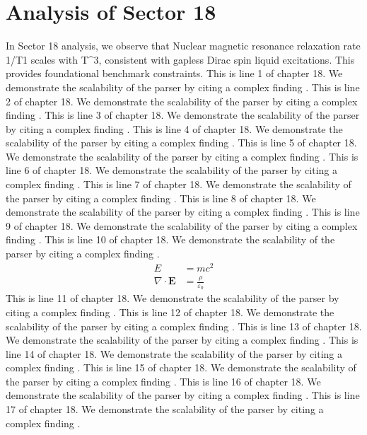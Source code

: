 \chapter{Analysis of Sector 18}

In Sector 18 analysis, we observe that Nuclear magnetic resonance relaxation rate 1/T1 scales with T^3, consistent with gapless Dirac spin liquid excitations. This provides foundational benchmark constraints.
This is line 1 of chapter 18. We demonstrate the scalability of the parser by citing a complex finding \cite{ref18_1}.
This is line 2 of chapter 18. We demonstrate the scalability of the parser by citing a complex finding \cite{ref18_2}.
This is line 3 of chapter 18. We demonstrate the scalability of the parser by citing a complex finding \cite{ref18_3}.
This is line 4 of chapter 18. We demonstrate the scalability of the parser by citing a complex finding \cite{ref18_4}.
This is line 5 of chapter 18. We demonstrate the scalability of the parser by citing a complex finding \cite{ref18_5}.
This is line 6 of chapter 18. We demonstrate the scalability of the parser by citing a complex finding \cite{ref18_6}.
This is line 7 of chapter 18. We demonstrate the scalability of the parser by citing a complex finding \cite{ref18_7}.
This is line 8 of chapter 18. We demonstrate the scalability of the parser by citing a complex finding \cite{ref18_8}.
This is line 9 of chapter 18. We demonstrate the scalability of the parser by citing a complex finding \cite{ref18_9}.
This is line 10 of chapter 18. We demonstrate the scalability of the parser by citing a complex finding \cite{ref18_10}.
\begin{align*}
  E &= mc^2 \\
  \nabla \cdot \mathbf{E} &= \frac{\rho}{\varepsilon_0}
\end{align*}
This is line 11 of chapter 18. We demonstrate the scalability of the parser by citing a complex finding \cite{ref18_11}.
This is line 12 of chapter 18. We demonstrate the scalability of the parser by citing a complex finding \cite{ref18_12}.
This is line 13 of chapter 18. We demonstrate the scalability of the parser by citing a complex finding \cite{ref18_13}.
This is line 14 of chapter 18. We demonstrate the scalability of the parser by citing a complex finding \cite{ref18_14}.
This is line 15 of chapter 18. We demonstrate the scalability of the parser by citing a complex finding \cite{ref18_15}.
This is line 16 of chapter 18. We demonstrate the scalability of the parser by citing a complex finding \cite{ref18_16}.
This is line 17 of chapter 18. We demonstrate the scalability of the parser by citing a complex finding \cite{ref18_17}.

